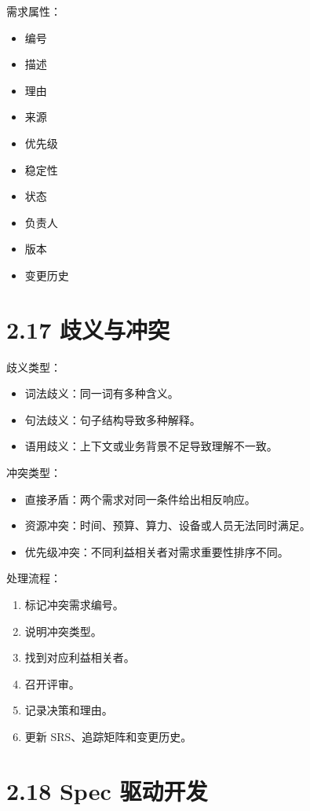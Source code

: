 \documentclass[UTF8,zihao=-4]{ctexart}
\begin{document}
需求属性：

\begin{itemize}
\item 编号
\item 描述
\item 理由
\item 来源
\item 优先级
\item 稳定性
\item 状态
\item 负责人
\item 版本
\item 变更历史
\end{itemize}

\section{2.17 歧义与冲突}

歧义类型：

\begin{itemize}
\item 词法歧义：同一词有多种含义。
\item 句法歧义：句子结构导致多种解释。
\item 语用歧义：上下文或业务背景不足导致理解不一致。
\end{itemize}

冲突类型：

\begin{itemize}
\item 直接矛盾：两个需求对同一条件给出相反响应。
\item 资源冲突：时间、预算、算力、设备或人员无法同时满足。
\item 优先级冲突：不同利益相关者对需求重要性排序不同。
\end{itemize}

处理流程：

\begin{enumerate}
\item 标记冲突需求编号。
\item 说明冲突类型。
\item 找到对应利益相关者。
\item 召开评审。
\item 记录决策和理由。
\item 更新 SRS、追踪矩阵和变更历史。
\end{enumerate}

\section{2.18 Spec 驱动开发}
\end{document}
